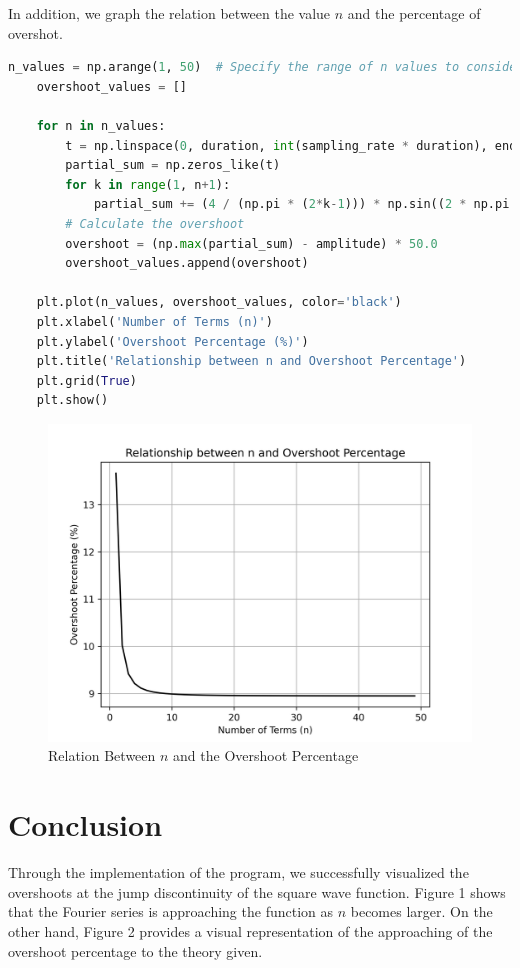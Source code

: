 \documentclass[12pt]{article}
\theoremstyle{definition}
\begin{document}
In addition, we graph the relation between the value $n$ and the percentage of overshot.
\begin{lstlisting}[language=Python]
    n_values = np.arange(1, 50)  # Specify the range of n values to consider
    overshoot_values = []

    for n in n_values:
        t = np.linspace(0, duration, int(sampling_rate * duration), endpoint=False)
        partial_sum = np.zeros_like(t)
        for k in range(1, n+1):
            partial_sum += (4 / (np.pi * (2*k-1))) * np.sin((2 * np.pi * (2*k-1) * frequency * t))
        # Calculate the overshoot
        overshoot = (np.max(partial_sum) - amplitude) * 50.0
        overshoot_values.append(overshoot)

    plt.plot(n_values, overshoot_values, color='black')
    plt.xlabel('Number of Terms (n)')
    plt.ylabel('Overshoot Percentage (%)')
    plt.title('Relationship between n and Overshoot Percentage')
    plt.grid(True)
    plt.show()
\end{lstlisting}

\afterpage{
    \clearpage
}
    
\begin{figure}[htbp]
    \centering
    \includegraphics[scale=0.7]{relation.png}
    \caption{Relation Between $n$ and the Overshoot Percentage}
    \label{fig:relation}
\end{figure}

\section{Conclusion}
Through the implementation of the program, we successfully visualized the overshoots at the jump discontinuity of the square wave function. Figure 1 shows that the Fourier series is approaching the function as $n$ becomes larger. On the other hand, Figure 2 provides a visual representation of the approaching of the overshoot percentage to the theory given.
\end{document}
